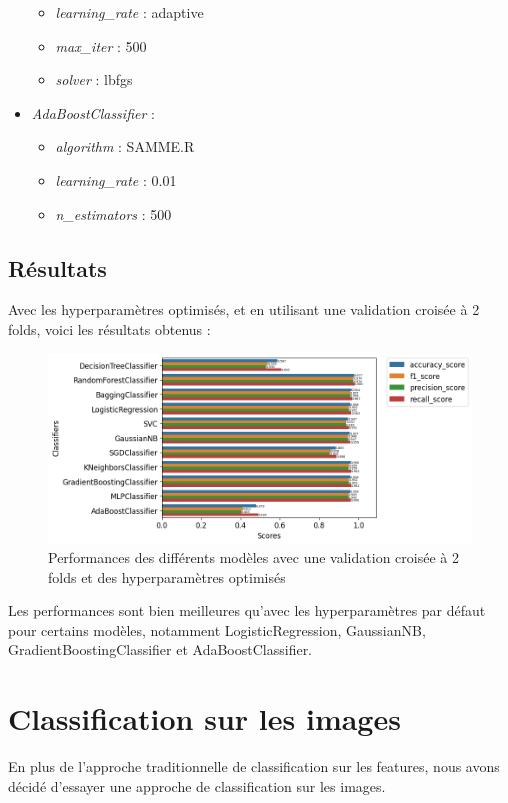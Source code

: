 \documentclass{article}
\begin{document}
\begin{small}
\begin{multicols}{2}
\begin{itemize}
\begin{itemize}
        \item \textit{learning\_rate} : adaptive
        \item \textit{max\_iter} : 500
        \item \textit{solver} : lbfgs
    \end{itemize}
    \item \textit{AdaBoostClassifier} :
    \begin{itemize}
        \item \textit{algorithm} : SAMME.R
        \item \textit{learning\_rate} : 0.01
        \item \textit{n\_estimators} : 500
    \end{itemize}
\end{itemize}
\end{multicols}
\end{small}

\subsection{Résultats}
Avec les hyperparamètres optimisés, et en utilisant une validation croisée à 2 folds,
voici les résultats obtenus :

\begin{figure}[h]
    \centering
    \includegraphics[width=1.2\textwidth]{img/all_perfs_with_cv_and_best_hp.png}
    \caption{Performances des différents modèles avec une validation croisée à 2 folds et des hyperparamètres optimisés}
\end{figure}

Les performances sont bien meilleures qu'avec les hyperparamètres par défaut pour certains
modèles, notamment LogisticRegression, GaussianNB, GradientBoostingClassifier
et AdaBoostClassifier.

\newpage
\section{Classification sur les images}
En plus de l'approche traditionnelle de classification sur les features, nous avons
décidé d'essayer une approche de classification sur les images. 
\end{document}
